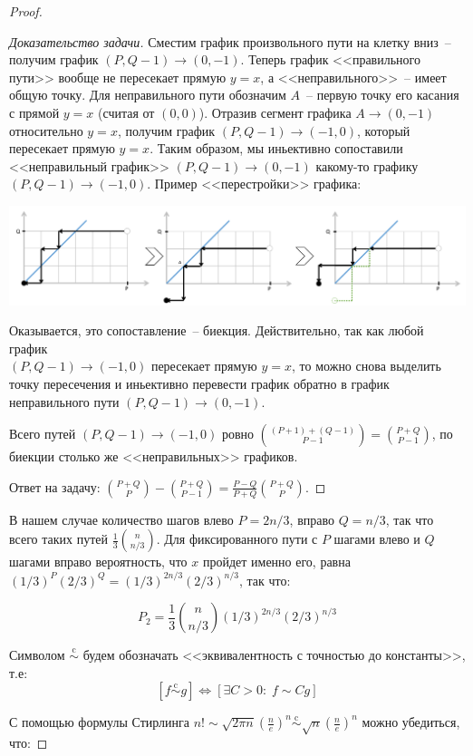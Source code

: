 \begin{proof}
\begin{proof}[Доказательство задачи]
	Сместим график произвольного пути на клетку вниз~-- получим график $(P, Q-1)\rightarrow (0, -1)$. Теперь график <<правильного пути>> вообще не пересекает прямую $y=x$, а <<неправильного>>~-- имеет общую точку. Для неправильного пути обозначим $A$~-- первую точку его касания с прямой $y=x$ (считая от $(0, 0)$). Отразив сегмент графика $A \rightarrow (0, -1)$ относительно $y=x$, получим график $(P, Q-1) \rightarrow (-1, 0)$, который пересекает прямую $y=x$. Таким образом, мы иньективно сопоставили <<неправильный график>> $(P, Q-1)\rightarrow (0, -1)$ какому-то графику $(P, Q-1) \rightarrow (-1, 0)$. Пример <<перестройки>> графика:

	\begin{center}
		\includegraphics[width=\textwidth]{figures/path2.png}
	\end{center}

	Оказывается, это сопоставление~-- биекция. Действительно, так как любой график \\$(P, Q-1) \rightarrow (-1, 0)$ пересекает прямую $y=x$, то можно снова выделить точку пересечения и иньективно перевести график обратно в график неправильного пути $(P, Q-1) \rightarrow (0, -1)$.

	Всего путей $(P, Q-1) \rightarrow (-1, 0)$ ровно ${(P+1)+(Q-1) \choose P-1} = {P+Q\choose P-1}$, по биекции столько же <<неправильных>> графиков.

	Ответ на задачу: ${P+Q\choose P} - {P+Q\choose P-1} = \frac{P-Q}{P+Q}{P+Q\choose P}.$
\end{proof}

В нашем случае количество шагов влево $P = 2n/3$, вправо $Q=n/3$, так что всего таких путей $\frac{1}{3}{n\choose n/3}$. Для фиксированного пути с $P$ шагами влево и $Q$ шагами вправо вероятность, что $x$ пройдет именно его, равна $(1/3)^P (2/3)^Q = (1/3)^{2n/3} (2/3)^{n/3}$, так что:

$$P_2 = \frac{1}{3} {n\choose n/3} (1/3)^{2n/3} (2/3)^{n/3}$$

\newcommand{\scm}{\overset{\text{c}}{\sim}}
Символом $\scm$ будем обозначать <<эквивалентность с точностью до константы>>, т.е: $$[f \scm g] \iff [\exists C > 0: \; f \sim Cg]$$

С помощью формулы Стирлинга $n! \sim \sqrt{2\pi n}\left(\frac{n}{e}\right)^n \scm \sqrt{n}\left(\frac{n}{e}\right)^n$ можно убедиться, что:


\end{proof}
